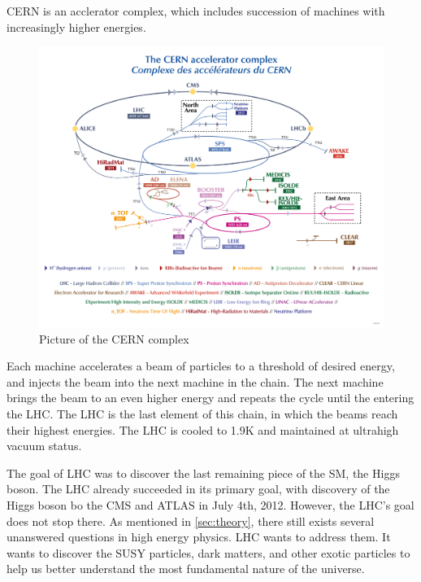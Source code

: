 CERN is an acclerator complex, which includes succession of machines with increasingly higher energies. 
\begin{figure}[h!]
	\caption{Picture of the CERN complex \cite{CERN}}
  \label{fig:CERN}
  \centering
  \includegraphics[width=1.0\linewidth]{figs/LHC.png}
\end{figure}
Each machine accelerates a beam of particles to a threshold of desired energy, and injects the beam into the next machine in the chain. 
The next machine brings the beam to an even higher energy and repeats the cycle until the entering the LHC. 
The LHC is the last element of this chain, in which the beams reach their highest energies.
The LHC is cooled to 1.9K and maintained at ultrahigh vacuum status.

The goal of LHC was to discover the last remaining piece of the SM, the Higgs boson.
The LHC already succeeded in its primary goal, with discovery of the Higgs boson bo the CMS and ATLAS in July 4th, 2012.
However, the LHC's goal does not stop there. 
As mentioned in \ref{sec:theory}, there still exists several unanswered questions in high energy physics.
LHC wants to address them. It wants to discover the SUSY particles, dark matters, and other exotic particles to help us better understand the most fundamental nature of the universe.

